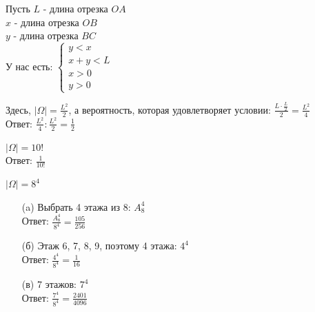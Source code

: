 \begin{exercise}[3]
	
	Пусть $L$ - длина отрезка $OA$ \\ $x$ - длина отрезка $OB$ \\ $y$ - длина отрезка $BC$ \\ У нас есть: $\begin{cases}
		y < x \\ x +y < L \\ x > 0 \\ y > 0
	\end{cases}$
	
	
	Здесь, $| \Omega | = \frac{L^2}{2}$, а вероятность, которая удовлетворяет условии: $\frac{L \cdot \frac{L}{2}}{2} = \frac{L^2}{4}$ \\ Ответ: $\frac{L^2}{4} : \frac{L^2}{2} = \frac{1}{2}$
\end{exercise}

\begin{exercise}[4]
	$| \Omega | = 10!$ \\ Ответ: $\frac{1}{10!}$
\end{exercise}

\begin{exercise}[5]
	$| \Omega | = 8^4$
	\begin{enumerate}
		\item [(a)] Выбрать 4 этажа из 8: $A^4_8$ \\ Ответ: $\frac{A^4_8}{8^4} = \frac{105}{256}$
		\item [(б)] Этаж 6, 7, 8, 9, поэтому 4 этажа: $4^4$ \\ Ответ: $\frac{4^4}{8^4} = \frac{1}{16}$
		\item [(в)] 7 этажов: $7^4$ \\ Ответ: $\frac{7^4}{8^4} = \frac{2401}{4096}$
	\end{enumerate}
\end{exercise}

